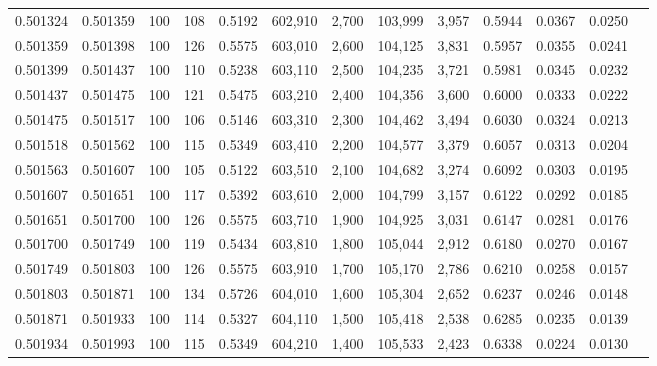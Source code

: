 \begin{tabular}{rrrrrrrrrrrrr}
0.501324 & 0.501359 &   100 & 108 &                                     0.5192 & 602,910 &   2,700 & 103,999 &   3,957 & 0.5944 & 0.0367 & 0.0250 \\
0.501359 & 0.501398 &   100 & 126 &                                     0.5575 & 603,010 &   2,600 & 104,125 &   3,831 & 0.5957 & 0.0355 & 0.0241 \\
0.501399 & 0.501437 &   100 & 110 &                                     0.5238 & 603,110 &   2,500 & 104,235 &   3,721 & 0.5981 & 0.0345 & 0.0232 \\
0.501437 & 0.501475 &   100 & 121 &                                     0.5475 & 603,210 &   2,400 & 104,356 &   3,600 & 0.6000 & 0.0333 & 0.0222 \\
0.501475 & 0.501517 &   100 & 106 &                                     0.5146 & 603,310 &   2,300 & 104,462 &   3,494 & 0.6030 & 0.0324 & 0.0213 \\
0.501518 & 0.501562 &   100 & 115 &                                     0.5349 & 603,410 &   2,200 & 104,577 &   3,379 & 0.6057 & 0.0313 & 0.0204 \\
0.501563 & 0.501607 &   100 & 105 &                                     0.5122 & 603,510 &   2,100 & 104,682 &   3,274 & 0.6092 & 0.0303 & 0.0195 \\
0.501607 & 0.501651 &   100 & 117 &                                     0.5392 & 603,610 &   2,000 & 104,799 &   3,157 & 0.6122 & 0.0292 & 0.0185 \\
0.501651 & 0.501700 &   100 & 126 &                                     0.5575 & 603,710 &   1,900 & 104,925 &   3,031 & 0.6147 & 0.0281 & 0.0176 \\
0.501700 & 0.501749 &   100 & 119 &                                     0.5434 & 603,810 &   1,800 & 105,044 &   2,912 & 0.6180 & 0.0270 & 0.0167 \\
0.501749 & 0.501803 &   100 & 126 &                                     0.5575 & 603,910 &   1,700 & 105,170 &   2,786 & 0.6210 & 0.0258 & 0.0157 \\
0.501803 & 0.501871 &   100 & 134 &                                     0.5726 & 604,010 &   1,600 & 105,304 &   2,652 & 0.6237 & 0.0246 & 0.0148 \\
0.501871 & 0.501933 &   100 & 114 &                                     0.5327 & 604,110 &   1,500 & 105,418 &   2,538 & 0.6285 & 0.0235 & 0.0139 \\
0.501934 & 0.501993 &   100 & 115 &                                     0.5349 & 604,210 &   1,400 & 105,533 &   2,423 & 0.6338 & 0.0224 & 0.0130 \\

\end{tabular}
